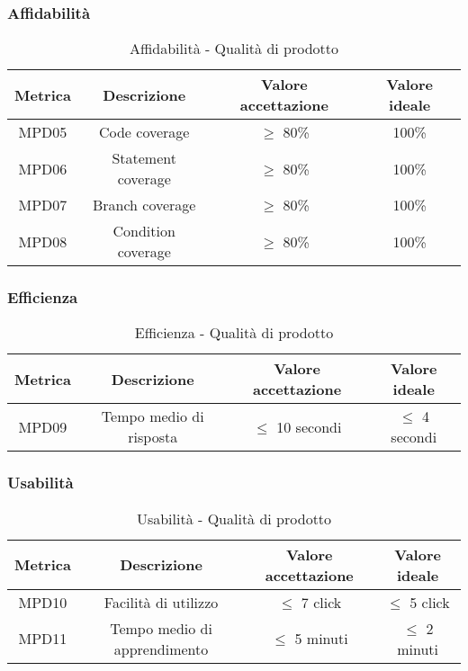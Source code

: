 \documentclass[10pt]{article}
\begin{document}
\begin{justify}
\subsubsection{Affidabilità}
\begin{table}[H]
  \centering
\begin{tabular}{|c|c|c|c|}
  \hline
  \textbf{Metrica} & \textbf{Descrizione} & \textbf{Valore accettazione} & \textbf{Valore ideale}\\
  \hline
  MPD05 & Code coverage & $\geq$ 80\% & 100\% \\
  \hline
  MPD06 & Statement coverage & $\geq$ 80\% & 100\% \\
  \hline
  MPD07 & Branch coverage & $\geq$ 80\% & 100\% \\
  \hline
  MPD08 & Condition coverage & $\geq$ 80\% & 100\% \\
  \hline
\end{tabular}
\caption{Affidabilità - Qualità di prodotto}
\label{tab:affidabilità}
\end{table}

\subsubsection{Efficienza}
\begin{table}[H]
  \centering
\begin{tabular}{|c|c|c|c|}
  \hline
  \textbf{Metrica} & \textbf{Descrizione} & \textbf{Valore accettazione} & \textbf{Valore ideale}\\
  \hline
  MPD09 & Tempo medio di risposta & $\leq$ 10 secondi & $\leq$ 4 secondi \\
  \hline
\end{tabular}
\caption{Efficienza - Qualità di prodotto}
\label{tab:efficienza}
\end{table}

\subsubsection{Usabilità}
\begin{table}[H]
  \centering
\begin{tabular}{|c|c|c|c|}
  \hline
  \textbf{Metrica} & \textbf{Descrizione} & \textbf{Valore accettazione} & \textbf{Valore ideale}\\
  \hline
  MPD10 & Facilità di utilizzo & $\leq$ 7 click & $\leq$ 5 click\\
  \hline
  MPD11 & Tempo medio di apprendimento & $\leq$ 5 minuti & $\leq$ 2 minuti \\
  \hline
\end{tabular}
\caption{Usabilità - Qualità di prodotto}
\label{tab:usabilità}
\end{table}


\end{justify}
\end{document}
